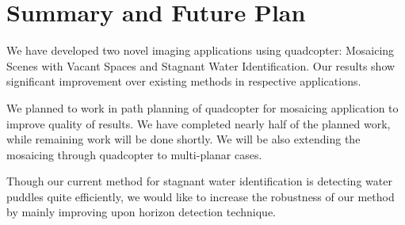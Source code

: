 \documentclass[11pt]{article}
\begin{document}
\section{Summary and Future Plan}
We have developed two novel imaging applications using quadcopter: Mosaicing
Scenes with Vacant Spaces and Stagnant Water Identification. Our results show
significant improvement over existing methods in respective applications.

We planned to work in path planning of quadcopter for mosaicing application to 
improve quality of results. We have completed nearly half of the planned work, 
while remaining work will be done shortly. We will be also extending the mosaicing
through quadcopter to multi-planar cases.

Though our current method for stagnant water identification is detecting water
puddles quite efficiently, we would like to increase the robustness of our
method by mainly improving upon horizon detection technique.    
\newpage


\end{document}
